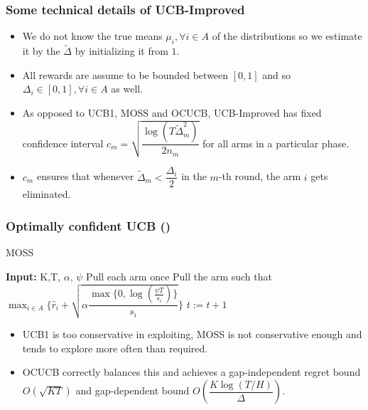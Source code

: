 \begin{frame}
\frametitle{Some technical details of UCB-Improved}
\begin{itemize}
\item<1-> We do not know the true means $\mu_i ,\forall i\in A$ of the distributions so we estimate it by the $\tilde{\Delta}$ by initializing it from $1$.
\item<2-> All rewards are assume to be bounded between $[0,1]$ and so $\Delta_{i}\in [0,1],\forall i\in A$ as well.
\item<3-> As opposed to UCB1, MOSS and OCUCB, UCB-Improved has fixed confidence interval  $c_{m}=\sqrt{\dfrac{\log{(T\tilde{\Delta}_{m}^{2})}}{2 n_{m}}}$ for all arms in a particular phase.
\item<4-> $c_m$ ensures that whenever $\tilde{\Delta}_{m}<\dfrac{\Delta_i}{2}$ in the $m$-th round, the arm $i$ gets eliminated.
\end{itemize}
\end{frame}

\begin{frame}
\frametitle{Optimally confident UCB (\cite{lattimore2015optimally})}
\begin{algorithm}[H]
\caption{MOSS}
\begin{algorithmic}[1]
\State \textbf{Input: } K,T, $\alpha$, $\psi$
\State Pull each arm once
\State Pull the arm such that $\max_{i\in A}\bigg\lbrace\hat{r}_{i} + \sqrt{\alpha\dfrac{\max\lbrace 0,\log(\frac{\psi T}{ s_i})\rbrace}{s_i}}\bigg\rbrace$
\State $t:=t+1 $
 \EndFor
\end{algorithmic}
\end{algorithm}
\begin{itemize}
\item<1-> UCB1 is too conservative in exploiting, MOSS is not conservative enough and tends to explore more often than required. 
\item<1-> OCUCB correctly balances this and achieves a gap-independent regret bound  $O\left(\sqrt{KT}\right)$ and gap-dependent bound $O \left(\dfrac{K\log (T/H)}{\Delta}\right)$.
\end{itemize}
\end{frame}

